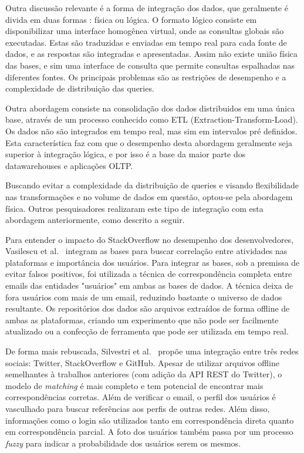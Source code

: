 \documentclass[sigconf]{acmart}
\begin{document}
Outra discussão relevante é a forma de integração dos dados, que geralmente é divida em duas formas : física ou lógica\cite{ozsu2011}. O formato lógico consiste em disponibilizar uma interface homogênea virtual, onde as consultas globais são executadas. Estas são traduzidas e enviadas em tempo real para cada fonte de dados, e as respostas são integradas e apresentadas. Assim não existe união física das bases, e sim uma interface de consulta que permite consultas espalhadas nas diferentes fontes. Os principais problemas são as restrições de desempenho e a complexidade de distribuição das queries.

Outra abordagem consiste na consolidação dos dados distribuidos em uma única base, através de um processo conhecido como ETL (Extraction-Transform-Load). Os dados não são integrados em tempo real, mas sim em intervalos pré definidos. Esta característica faz com que o desempenho desta abordagem geralmente seja superior à integração lógica, e por isso é a base da maior parte dos datawarehouses e aplicações OLTP.

Buscando evitar a complexidade da distribuição de queries e visando flexibilidade nas transformações e no volume de dados em questão, optou-se pela abordagem física. Outros pesquisadores realizaram este tipo de integração com esta abordagem anteriormente, como descrito a seguir.

Para entender o impacto do StackOverflow no desempenho dos desenvolvedores, Vasilescu et al.~\cite{vasilescu2013} integram as bases para buscar correlação entre atividades nas plataformas e importância dos usuários. Para integrar as bases, sob a premissa de evitar falsos positivos, foi utilizada a técnica de correspondência completa entre emails das entidades "usuários" em ambas as bases de dados. A técnica deixa de fora usuários com mais de um email, reduzindo bastante o universo de dados resultante. Os repositórios dos dados são arquivos extraídos de forma offline de ambas as plataformas, criando um experimento que não pode ser facilmente atualizado ou a confecção de ferramenta que pode ser utilizada em tempo real.

De forma mais rebuscada, Silvestri et al.~\cite{silvestri2015} propõe uma integração entre três redes sociais: Twitter, StackOverflow e GitHub. Apesar de utilizar arquivos offline semelhantes à trabalhos anteriores (com adição da API REST do Twitter), o modelo de \textit{matching} é mais completo e tem potencial de encontrar mais correspondências corretas. Além de verificar o email, o perfil dos usuários é vasculhado para buscar referências aos perfis de outras redes. Além disso, informações como o login são utilizados tanto em correspondência direta quanto em correspondência parcial. A foto dos usuários também passa por um processo \textit{fuzzy} para indicar a probabilidade dos usuários serem os mesmos.
\end{document}
